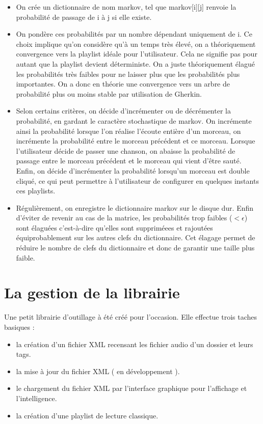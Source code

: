 \documentclass{report}
\begin{document}
\begin{itemize}
\item
On crée un dictionnaire de nom markov, tel que markov[i][j] renvoie la probabilité de passage de i à j si elle existe.
\item
On pondère ces probabilités par un nombre dépendant uniquement de i. Ce choix implique qu'on considère qu'à un temps très élevé, on a théoriquement convergence vers la playlist idéale pour l'utilisateur. Cela ne signifie pas pour autant que la playlist devient déterministe. On a juste théoriquement élagué les probabilités très faibles pour ne laisser plus que les probabilités plus importantes. On a donc en théorie une convergence vers un arbre de probabilité plus ou
moins stable par utilisation de Gherkin.
\item
Selon certains critères, on décide d'incrémenter ou de décrémenter la probabilité, en gardant le caractère stochastique de markov. On incrémente ainsi la probabilité lorsque l'on réalise l'écoute entière d'un morceau, on incrémente la probabilité entre le morceau précédent et ce morceau. Lorsque l'utilisateur décide de passer une chanson, on abaisse la probabilité de passage entre le morceau précédent et le morceau qui vient d'être sauté. Enfin, on décide
d'incrémenter la probabilité lorsqu'un morceau est double cliqué, ce qui peut permettre à l'utilisateur de configurer en quelques instants ces playlists.
\item
Régulièrement, on enregistre le dictionnaire markov sur le disque dur. Enfin d'éviter de revenir au cas de la matrice, les probabilités trop faibles ($ < \epsilon$) sont élaguées c'est-à-dire qu'elles sont suppriméees et rajoutées équiprobablement sur les autres clefs du dictionnaire. Cet élagage permet de réduire le nombre de clefs du dictionnaire et donc de garantir une taille plus faible.
\end{itemize}



\section*{La gestion de la librairie}

Une petit librairie d'outillage à été créé pour l'occasion. Elle effectue trois taches basiques :
\begin{itemize}
\item la création d'un fichier XML recensant les fichier audio d'un dossier et leurs tags.
\item la mise à jour du fichier XML ( en développement ).
\item le chargement du fichier XML par l'interface graphique pour l'affichage et l'intelligence.
\item la création d'une playlist de lecture classique.
\end{itemize}
\end{document}
